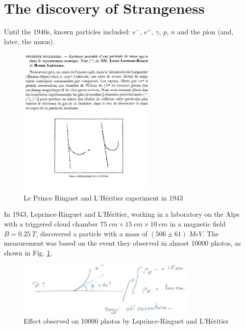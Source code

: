 \section{The discovery of Strangeness}

Until the 1940s, known particles included: $e^-$, $e^+$, $\gamma$, $p$, $n$ and the pion (and, later, the muon).

\begin{figure}[!h]
    \centering
    \includegraphics[width=0.6\textwidth]{Figures/FNSN27_1.JPG}
    \caption{Le Prince Ringuet and L'Héritier experiment in 1943}
\end{figure} 

In 1943, Leprince-Ringuet and L'Héritier, working in a laboratory on the Alps with a triggered cloud chamber \(\SI{75}{cm} \times \SI{15}{cm}\times\SI{10}{cm}\) in a magnetic field $B = \SI{0.25}{T}$, discovered a particle with a mass of $(506 \pm 61) \ MeV$.
The measurement was based on the event they observed in almost $10000$ photos, as shown in Fig. \ref{fig:LepRing}.

\begin{figure}[!h]
    \centering
    \includegraphics[width=0.8\textwidth]{Figures/FNSN27_2.JPG}
    \caption{Effect observed on 10000 photos by Leprince-Ringuet and L'Héritier}
    \label{fig:LepRing}
\end{figure} 


